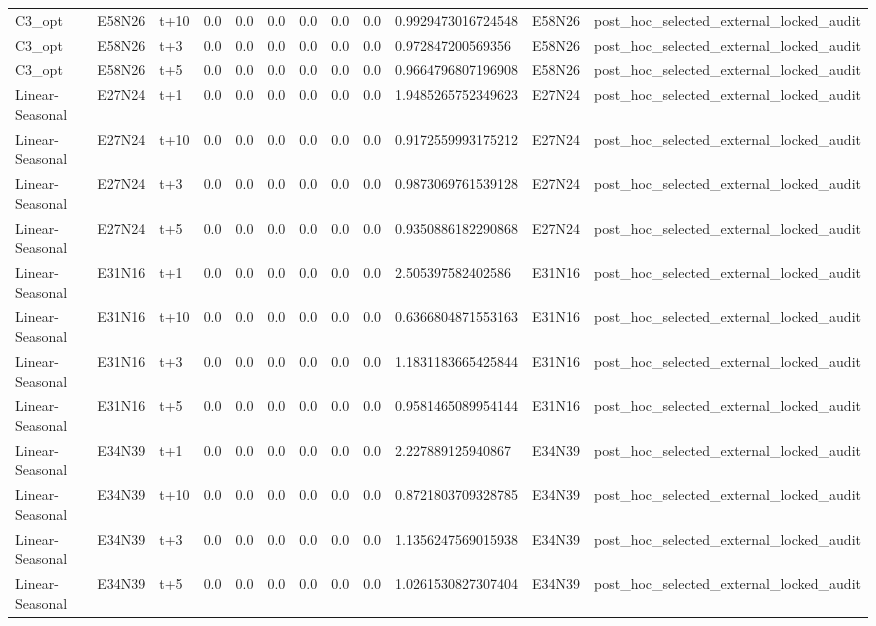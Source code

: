 \begin{landscape}
\begin{longtable}{llllllllllll}
C3\_opt & E58N26 & t+10 & 0.0 & 0.0 & 0.0 & 0.0 & 0.0 & 0.0 & 0.9929473016724548 & E58N26 & post\_hoc\_selected\_external\_locked\_audit \\
C3\_opt & E58N26 & t+3 & 0.0 & 0.0 & 0.0 & 0.0 & 0.0 & 0.0 & 0.972847200569356 & E58N26 & post\_hoc\_selected\_external\_locked\_audit \\
C3\_opt & E58N26 & t+5 & 0.0 & 0.0 & 0.0 & 0.0 & 0.0 & 0.0 & 0.9664796807196908 & E58N26 & post\_hoc\_selected\_external\_locked\_audit \\
Linear-Seasonal & E27N24 & t+1 & 0.0 & 0.0 & 0.0 & 0.0 & 0.0 & 0.0 & 1.9485265752349623 & E27N24 & post\_hoc\_selected\_external\_locked\_audit \\
Linear-Seasonal & E27N24 & t+10 & 0.0 & 0.0 & 0.0 & 0.0 & 0.0 & 0.0 & 0.9172559993175212 & E27N24 & post\_hoc\_selected\_external\_locked\_audit \\
Linear-Seasonal & E27N24 & t+3 & 0.0 & 0.0 & 0.0 & 0.0 & 0.0 & 0.0 & 0.9873069761539128 & E27N24 & post\_hoc\_selected\_external\_locked\_audit \\
Linear-Seasonal & E27N24 & t+5 & 0.0 & 0.0 & 0.0 & 0.0 & 0.0 & 0.0 & 0.9350886182290868 & E27N24 & post\_hoc\_selected\_external\_locked\_audit \\
Linear-Seasonal & E31N16 & t+1 & 0.0 & 0.0 & 0.0 & 0.0 & 0.0 & 0.0 & 2.505397582402586 & E31N16 & post\_hoc\_selected\_external\_locked\_audit \\
Linear-Seasonal & E31N16 & t+10 & 0.0 & 0.0 & 0.0 & 0.0 & 0.0 & 0.0 & 0.6366804871553163 & E31N16 & post\_hoc\_selected\_external\_locked\_audit \\
Linear-Seasonal & E31N16 & t+3 & 0.0 & 0.0 & 0.0 & 0.0 & 0.0 & 0.0 & 1.1831183665425844 & E31N16 & post\_hoc\_selected\_external\_locked\_audit \\
Linear-Seasonal & E31N16 & t+5 & 0.0 & 0.0 & 0.0 & 0.0 & 0.0 & 0.0 & 0.9581465089954144 & E31N16 & post\_hoc\_selected\_external\_locked\_audit \\
Linear-Seasonal & E34N39 & t+1 & 0.0 & 0.0 & 0.0 & 0.0 & 0.0 & 0.0 & 2.227889125940867 & E34N39 & post\_hoc\_selected\_external\_locked\_audit \\
Linear-Seasonal & E34N39 & t+10 & 0.0 & 0.0 & 0.0 & 0.0 & 0.0 & 0.0 & 0.8721803709328785 & E34N39 & post\_hoc\_selected\_external\_locked\_audit \\
Linear-Seasonal & E34N39 & t+3 & 0.0 & 0.0 & 0.0 & 0.0 & 0.0 & 0.0 & 1.1356247569015938 & E34N39 & post\_hoc\_selected\_external\_locked\_audit \\
Linear-Seasonal & E34N39 & t+5 & 0.0 & 0.0 & 0.0 & 0.0 & 0.0 & 0.0 & 1.0261530827307404 & E34N39 & post\_hoc\_selected\_external\_locked\_audit \\

\end{longtable}
\end{landscape}

